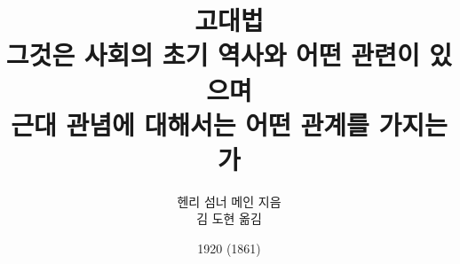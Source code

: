\documentclass[b5paper]{book}
\begin{document}
\title{고대법\\
\large 그것은 사회의 초기 역사와 어떤 관련이 있으며\\
근대 관념에 대해서는 어떤 관계를 가지는가}
\author{헨리 섬너 메인 지음\\
김 도현 옮김}
\date{1920 (1861)}

\frontmatter

\maketitle
\tableofcontents

\mainmatter











\end{document}
